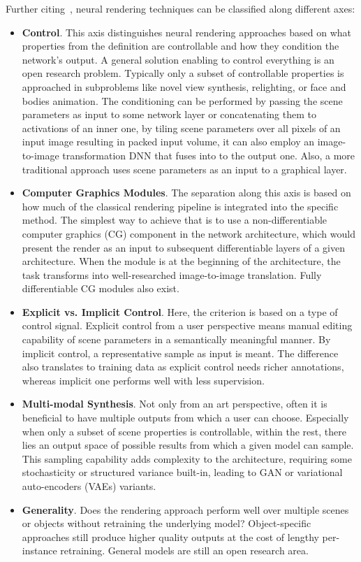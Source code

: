 Further citing~\citet{SOTARendering}, neural rendering techniques can be classified along different axes:
\begin{itemize}
    \item \textbf{Control}. This axis distinguishes neural rendering approaches based on
    what properties from the definition are controllable and how they condition
    the network's output. A general solution enabling to control everything is an open
    research problem. Typically only a subset of controllable properties is approached
    in subproblems like novel view synthesis, relighting, or face and bodies animation.
    The conditioning can be performed by passing the scene parameters as input to some network
    layer or concatenating them to activations of an inner one, by tiling scene parameters over
    all pixels of an input image resulting in packed input volume, it can also employ
    an image-to-image transformation DNN that fuses  into to the output one.
    Also, a more traditional approach uses scene parameters as an input to a graphical layer.
    \item \textbf{Computer Graphics Modules}. The separation along this axis is based on how much
    of the classical rendering pipeline is integrated into the specific method. The simplest way 
    to achieve that is to use a non-differentiable computer graphics (CG) component in the network
    architecture, which would present the render as an input to subsequent differentiable layers of a given architecture.
    When the module is at the beginning of the architecture, the task transforms into
    well-researched image-to-image translation. Fully differentiable CG modules also exist.
    \item \textbf{Explicit vs. Implicit Control}. Here, the criterion is based on a type of 
    control signal. Explicit control from a user perspective means manual editing capability
    of scene parameters in a semantically meaningful manner. By implicit control, a representative
    sample as input is meant. The difference also translates to training data as explicit control
    needs richer annotations, whereas implicit one performs well with less supervision.
    \item \textbf{Multi-modal Synthesis}. Not only from an art perspective, often it is beneficial to have
    multiple outputs from which a user can choose. Especially when only a subset of scene properties is
    controllable, within the rest, there lies an output space of possible results from which a given model
    can sample. This sampling capability adds complexity to the architecture, requiring some
    stochasticity or structured variance built-in, leading to GAN or variational auto-encoders (VAEs) variants.  %
    \item \textbf{Generality}. Does the rendering approach perform well over multiple
    scenes or objects without retraining the underlying model? Object-specific approaches
    still produce higher quality outputs at the cost of lengthy per-instance retraining. General models
    are still an open research area.
\end{itemize}

